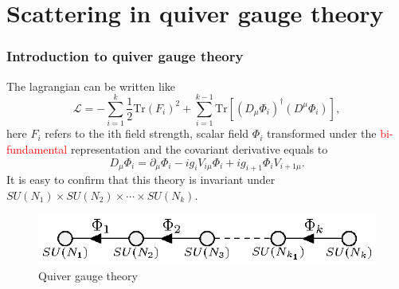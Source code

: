 \documentclass{beamer}
\begin{document}
\section{Scattering in quiver gauge theory}
\begin{frame}
    \frametitle{Introduction to quiver gauge theory}
    The lagrangian can be written like
    \begin{equation*}
        \mathcal{L}=-\sum_{i=1}^{k}\frac{1}{2}\mathrm{Tr}(F_i)^2+\sum_{i=1}^{k-1}\mathrm{Tr}[(D_\mu\Phi_i)^\dagger(D^\mu\Phi_i)],
    \end{equation*}
    here $F_i$ refers to the ith field strength, scalar field $\Phi_i$ transformed under the \textcolor{red}{bi-fundamental} representation and the covariant derivative equals to
    \begin{equation*}
        D_\mu \Phi_i=\partial_\mu \Phi_i -ig_iV_{i\mu}\Phi_i+ig_{i+1}\Phi_i V_{i+1\mu}.
    \end{equation*}
    It is easy to confirm that this theory is invariant under $SU(N_1)\times SU(N_2)\times\cdots\times SU(N_k)$.
    \begin{figure}
        \centering
        \includegraphics{test.eps}
        \caption{Quiver gauge theory}
        \label{1}
    \end{figure}
\end{frame}
\end{document}
